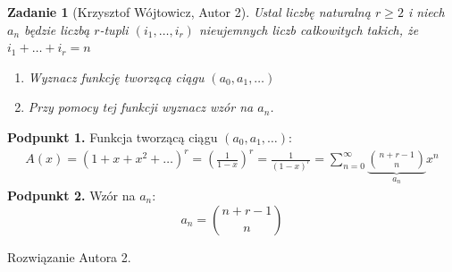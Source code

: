 \documentclass{mwart}
\newtheorem{zad}{Zadanie}[section]
\begin{document}
\begin{zad}[Krzysztof Wójtowicz, Autor 2]
    Ustal liczbę naturalną $r \geqslant 2$ i niech $a_n$ będzie liczbą $r$-tupli $(i_1,\dots,i_r)$ nieujemnych liczb całkowitych takich, że $i_1 + \dots + i_r = n$
    \begin{enumerate}
        \item Wyznacz funkcję tworzącą ciągu $(a_0,a_1,\dots)$
        \item Przy pomocy tej funkcji wyznacz wzór na $a_n$.
    \end{enumerate}
\end{zad}
\begin{mdframed}
    \textbf{Podpunkt 1.} \newline
    Funkcja tworzącą ciągu $(a_0,a_1,\dots)$:
    \begin{gather*}
        A(x) = (1 + x + x^2 + \dots)^r = (\frac{1}{1-x})^r = \frac{1}{(1-x)^r} = \sum_{n=0}^{\infty} \underbrace{\binom{n+r-1}{n}}_{a_n} x^n
    \end{gather*}
    \textbf{Podpunkt 2.} \newline
    Wzór na $a_n$:
    \[ a_n = \binom{n+r-1}{n} \]
\end{mdframed}
\begin{mdframed}
    Rozwiązanie Autora 2.
\end{mdframed}
\end{document}
